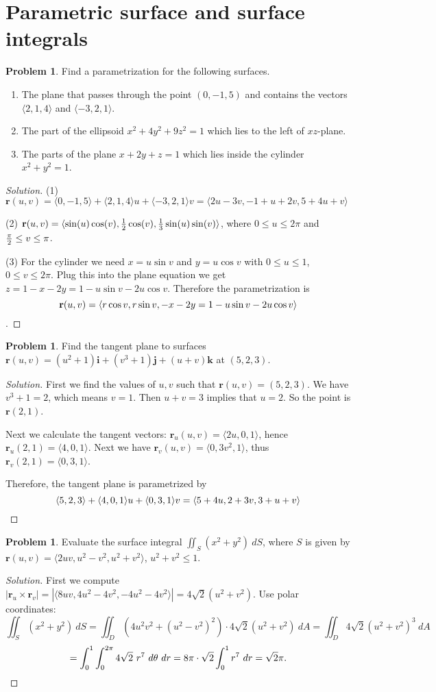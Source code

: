 \documentclass[12pt]{amsart}%
\theoremstyle{plain}
\theoremstyle{definition}
\newtheorem{prob}[theorem]{Problem}
\theoremstyle{special}
\newcommand{\sol}[1]{
{\begin{proof}[Solution]#1\end{proof}}
}
\newcommand{\Prob}[1]{\begin{tcolorbox}%
\begin{prob}
	#1
\end{prob}
\end{tcolorbox}	
}
\renewcommand{\vec}{\mathbf}
\begin{document}
\section{Parametric surface and surface integrals}
\Prob{Find a parametrization for the following surfaces.
\begin{enumerate}
	\item The plane that passes through the point $(0,-1,5)$ and contains the vectors $\langle 2,1,4\rangle$ and $\langle -3,2,1\rangle$.
	\item The part of the ellipsoid $ x^2+4y^2+9z^2=1$ which lies to the left of $xz$-plane.
	\item The parts of the plane $x+2y+z=1$ which lies inside the cylinder $x^2+y^2=1$.
\end{enumerate}
}{
\sol{(1) $\vec r(u,v)=\langle 0,-1,5\rangle+\langle 2,1,4\rangle u+\langle -3,2,1\rangle v=\langle 2u-3v,-1+u+2v,5+4u+v\rangle $

(2) $\vec r(u,v)=\langle\sin(u)\cos(v),{1\over 2}\cos(v),{1\over 3}\sin(u)\sin(v) \rangle $, where $ 0\leq u\leq 2\pi$ and ${\pi\over 2}\leq v\leq {\pi}$.

(3) For the cylinder we need $x=u\sin v$ and $y=u\cos v$ with $0\leq u\leq 1$, $0\leq v\leq 2\pi$. Plug this into the plane equation we get
\(z=1-x-2y=1-u\sin v-2u\cos v\). Therefore the parametrization is
\[\vec r(u,v)=\langle r\cos v,r\sin v,-x-2y=1-u\sin v-2u\cos v\rangle\qedhere\].
}}

\Prob{Find the tangent plane to surfaces $ \vec r(u,v)=(u^2+1)\vec i+(v^3+1)\vec j+(u+v)\vec k$ at $(5,2,3)$.}
{
\sol{
First we find the values of $u,v$ such that $\vec r(u,v)=(5,2,3)$.  We have $v^3+1=2$, which means $v=1$. Then $u+v=3$ implies that $u=2$. So the point is $\vec r(2,1)$.

Next we calculate the tangent vectors: $\vec r_u(u,v)=\langle 2u,0,1\rangle$, hence $\vec r_u(2,1)=\langle 4,0,1\rangle$. Next we have $\vec r_v(u,v)=\langle 0,3v^2,1\rangle$, thus $\vec r_v(2,1)=\langle 0,3,1\rangle $.

Therefore, the tangent plane is parametrized by
\[\langle 5,2,3\rangle +\langle 4,0,1\rangle u+\langle 0,3,1\rangle v=\langle 5+4u,2+3v,3+u+v \rangle \qedhere\]
}
}
\Prob{ Evaluate the surface integral $\displaystyle\iint_{S}(x^2+y^2)\ dS$, where $S$ is given by $\vec r{(u,v)}=\langle 2uv,u^2-v^2,u^2+v^2\rangle  $, $ u^2+v^2\leq 1$.}
{
\sol{First we compute
\(|\vec r_u\times \vec r_v|%
=|\langle 8 u v, 4 u^2 - 4 v^2, -4 u^2 - 4 v^2\rangle |=4\sqrt{2}(u^2+v^2).\)
Use polar coordinates:
\[\iint_S(x^2+y^2)\ d S=\iint_D (4u^2v^2+(u^2-v^2)^2)\cdot 4\sqrt{2}(u^2+v^2)  \ d A =\iint_D4\sqrt{2}(u^2+v^2)^3\ d A\]
\[=\int_0^1 \int_0^{2\pi} 4\sqrt{2}\ r^7\ d\theta\ d r=8\pi\cdot \sqrt{2} \int_0^1r^7\ d r={\sqrt{2}\pi}.\qedhere\]
}
}
\end{document}
